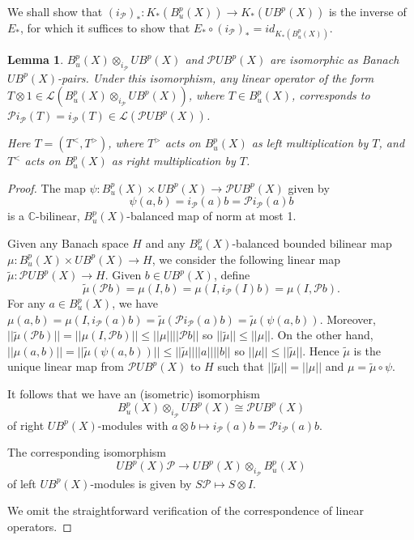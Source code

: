 \documentclass[a4,11pt]{amsart}
\newtheorem{lem}[thm]{Lemma}
\theoremstyle{remark}
\begin{document}
We shall show that $(i_\mathcal{P})_*:K_*(B^p_u(X))\rightarrow K_*(UB^p(X))$ is the inverse of $E_*$, for which it suffices to show that $E_*\circ(i_\mathcal{P})_*=id_{K_*(B^p_u(X))}$.


\begin{lem}
$B^p_u(X)\otimes_{i_\mathcal{P}}UB^p(X)$ and $\mathcal{P}UB^p(X)$ are isomorphic as Banach $UB^p(X)$-pairs.
Under this isomorphism, any linear operator of the form $T\otimes 1\in\mathcal{L}(B^p_u(X)\otimes_{i_\mathcal{P}}UB^p(X))$, where $T\in B^p_u(X)$, corresponds to $\mathcal{P}i_\mathcal{P}(T)=i_\mathcal{P}(T)\in\mathcal{L}(\mathcal{P}UB^p(X))$.

Here $T=(T^<,T^>)$, where $T^>$ acts on $B^p_u(X)$ as left multiplication by $T$, and $T^<$ acts on $B^p_u(X)$ as right multiplication by $T$.
\end{lem}

\begin{proof}
The map $\psi:B^p_u(X)\times UB^p(X)\rightarrow \mathcal{P}UB^p(X)$ given by \[\psi(a,b)=i_\mathcal{P}(a)b=\mathcal{P}i_\mathcal{P}(a)b\] is a $\mathbb{C}$-bilinear, $B^p_u(X)$-balanced map of norm at most 1.


Given any Banach space $H$ and any $B^p_u(X)$-balanced bounded bilinear map $\mu:B^p_u(X)\times UB^p(X)\rightarrow H$, we consider the following linear map $\tilde{\mu}:\mathcal{P}UB^p(X)\rightarrow H$.
Given $b\in UB^p(X)$, define \[\tilde{\mu}(\mathcal{P}b)=\mu(I,b)=\mu(I,i_\mathcal{P}(I)b)=\mu(I,\mathcal{P}b).\]
For any $a\in B^p_u(X)$, we have $\mu(a,b)=\mu(I,i_\mathcal{P}(a)b)=\tilde{\mu}(\mathcal{P}i_\mathcal{P}(a)b)=\tilde{\mu}(\psi(a,b))$.
Moreover, $||\tilde{\mu}(\mathcal{P}b)||=||\mu(I,\mathcal{P}b)||\leq ||\mu|| ||\mathcal{P}b||$ so $||\tilde{\mu}||\leq||\mu||$.
On the other hand, $||\mu(a,b)||=||\tilde{\mu}(\psi(a,b))||\leq||\tilde{\mu}|| ||a|| ||b||$ so $||\mu||\leq||\tilde{\mu}||$.
Hence $\tilde{\mu}$ is the unique linear map from $\mathcal{P}UB^p(X)$ to $H$ such that $||\tilde{\mu}||=||\mu||$ and $\mu=\tilde{\mu}\circ\psi$.

It follows that we have an (isometric) isomorphism \[ B^p_u(X)\otimes_{i_\mathcal{P}}UB^p(X)\cong \mathcal{P}UB^p(X) \] of right $UB^p(X)$-modules with $a\otimes b\mapsto i_\mathcal{P}(a)b=\mathcal{P}i_\mathcal{P}(a)b$.

The corresponding isomorphism \[UB^p(X)\mathcal{P}\rightarrow UB^p(X)\otimes_{i_\mathcal{P}}B^p_u(X)\] of left $UB^p(X)$-modules is given by $S\mathcal{P}\mapsto S\otimes I$.

We omit the straightforward verification of the correspondence of linear operators. \end{proof}
\end{document}
